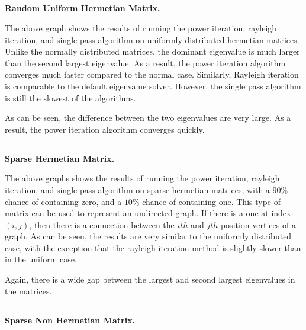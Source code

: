 \documentclass[11pt]{amsart}
\begin{document}
\subsection{} \textbf{Random Uniform Hermetian Matrix.}


The above graph shows the results of running the power iteration, rayleigh iteration, and single pass algorithm on uniformly distributed hermetian matrices. Unlike the normally distributed matrices, the dominant eigenvalue is much larger than the second largest eigenvalue. As a result, the power iteration algorithm converges much faster compared to the normal case. Similarly, Rayleigh iteration is comparable to the default eigenvalue solver. However, the single pass algorithm is still the slowest of the algorithms.


As can be seen, the difference between the two eigenvalues are very large. As a result, the power iteration algorithm converges quickly.

\subsection{} \textbf{Sparse Hermetian Matrix.}


The above graphs shows the results of running the power iteration, rayleigh iteration, and single pass algorithm on sparse hermetian matrices, with a $90\%$ chance of containing zero, and a $10\%$ chance of containing one. This type of matrix can be used to represent an undirected graph. If there is a one at index $(i,j)$, then there is a connection between the $ith$ and $jth$ position vertices of a graph. As can be seen, the results are very similar to the uniformly distributed case, with the exception that the rayleigh iteration method is slightly slower than in the uniform case.


Again, there is a wide gap between the largest and second largest eigenvalues in the matrices.

\subsection{} \textbf{Sparse Non Hermetian Matrix.}
\end{document}
